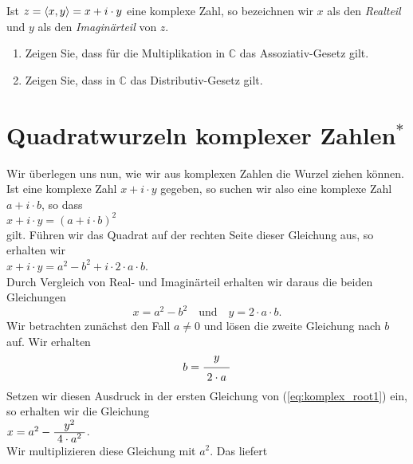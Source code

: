 Ist $z = \pair(x,y) = x + i \cdot y$ eine komplexe Zahl, so bezeichnen wir $x$ als den \emph{\color{blue}Realteil}
und $y$ als den \emph{\color{blue}Imagin\"{a}rteil} von $z$.

\exerciseStar
\renewcommand{\labelenumi}{(\alph{enumi})}
\begin{enumerate}
\item Zeigen Sie, dass f\"{u}r die Multiplikation in $\mathbb{C}$ das Assoziativ-Gesetz gilt.
\item Zeigen Sie, dass in $\mathbb{C}$ das Distributiv-Gesetz gilt. \exend
\end{enumerate}
\renewcommand{\labelenumi}{\arabic{enumi}.}


\section{Quadratwurzeln komplexer Zahlen$^*$}
Wir \"{u}berlegen uns nun, wie wir aus komplexen Zahlen die Wurzel ziehen k\"{o}nnen.  Ist eine komplexe Zahl
$x + i \cdot y$ gegeben, so suchen wir also eine komplexe Zahl $a + i \cdot b$, so dass
\\[0.2cm]
\hspace*{1.3cm}
$x + i \cdot y = (a + i \cdot b)^2$
\\[0.2cm]
gilt.  F\"{u}hren wir das Quadrat auf der rechten Seite dieser Gleichung aus, so erhalten wir
\\[0.2cm]
\hspace*{1.3cm}
$x + i \cdot y = a^2 - b^2 + i \cdot 2 \cdot a \cdot b$.
\\[0.2cm]
Durch Vergleich von Real- und Imagin\"{a}rteil erhalten wir daraus die beiden Gleichungen
\begin{equation}
  \label{eq:komplex_root1}
  x = a^2 - b^2 \quad \mbox{und} \quad y = 2 \cdot a \cdot b.
\end{equation}
Wir betrachten zun\"{a}chst den Fall $a \not= 0$ und
l\"{o}sen die zweite Gleichung nach $b$ auf.  Wir erhalten
\begin{equation}
  \label{eq:komplex_root2}
  b = \bruch{y}{2 \cdot a}  
\end{equation}
Setzen wir diesen Ausdruck in der ersten Gleichung von (\ref{eq:komplex_root1}) ein, so erhalten wir die
Gleichung 
\\[0.2cm]
\hspace*{1.3cm}
$x = a^2 - \bruch{y^2}{4 \cdot a^2}$.
\\[0.2cm]
Wir multiplizieren diese Gleichung mit $a^2$. Das liefert 
\\[0.2cm]
